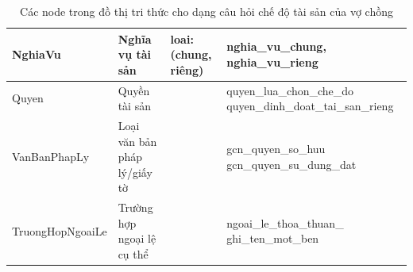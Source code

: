 \documentclass[../DoAn.tex]{subfiles}
\begin{document}
\begin{table}[htbp]
\begin{tabularx}{\textwidth}{|>{\raggedright\arraybackslash}p{2.1cm}|>{\raggedright\arraybackslash}p{2.0cm}|>{\raggedright\arraybackslash}p{3.1cm}|>{\raggedright\arraybackslash}X|}
NghiaVu &
Nghĩa vụ tài sản &
loai: (chung, riêng) &
nghia\_vu\_chung, nghia\_vu\_rieng \\ \hline

Quyen &
Quyền tài sản &
 &
quyen\_lua\_chon\_che\_do \newline quyen\_dinh\_doat\_tai\_san\_rieng \\ \hline

VanBan\-PhapLy &
Loại văn bản pháp lý/giấy tờ &
 &
gcn\_quyen\_so\_huu \newline
gcn\_quyen\_su\_dung\_dat \\ \hline

TruongHop\-NgoaiLe &
Trường hợp ngoại lệ cụ thể &
 &
ngoai\_le\_thoa\_thuan\_ \allowbreak ghi\_ten\_mot\_ben \\ \hline
\end{tabularx}
\caption{Các node trong đồ thị tri thức cho dạng câu hỏi chế độ tài sản của vợ chồng}
\label{tab:nodes_che_do_tai_san}
\end{table}
\end{document}
